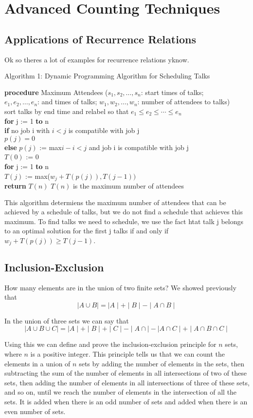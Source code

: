 \documentclass[../discrete.tex]{subfiles}
\begin{document}
\chapter{Advanced Counting Techniques}
\section{Applications of Recurrence Relations}
Ok so theres a lot of examples for recurrence relations yknow.

Algorithm 1: Dynamic Programming Algorithm for Scheduling Talks

\textbf{procedure} Maximum Attendees ($s_1,s_2,\dots,s_n$: start times of talks;\\ 
$e_1,e_2,\dots,e_n$: and times of talks; $w_1,w_2,\dots,w_n$: number of attendees to talks)\\
sort talks by end time and relabel so that $e_1\leq e_2\leq \cdots\leq e_n$\\
\textbf{for} j := 1 \textbf{to} n \\
\textbf{if} no job i with $i<j$ is compatible with job j \\
$p(j)=0$\\
\textbf{else} $p(j)$ := max{$i-i<j$ and job i is compatible with job j}\\
$T(0)$ := 0\\
\textbf{for} j := 1 \textbf{to} n \\
$T(j)$ := max($w_j+T(p(j)), T(j-1))$\\
\textbf{return} $T(n)$ {$T(n)$ is the maximum number of attendees}

This algorithm determiens the maximum number of attendees that can be achieved by a schedule of talks, but we do not 
find a schedule that achieves this maximum. To find talks we need to schedule, we use the fact htat talk j belongs to an optimal 
solution for the first j talks if and only if $w_j+T(p(j))\geq T(j-1)$. 
\section{Inclusion-Exclusion}
How many elements are in the union of two finite sets? We showed previously that 
\[\mid A \cup B \mid = \mid A \mid + \mid B \mid - \mid A \cap B \mid\]

In the union of three sets we can say that 
\[\mid A \cup B \cup C\mid = \mid A \mid + \mid B \mid + \mid C \mid - \mid A \cap \mid - \mid A \cap C\mid + \mid A \cap B \cap C \mid\]

Using this we can define and prove the inclusion-exclusion principle for $n$ sets, where $n$ is a positive integer. 
This principle tells us that we can count the elements in a union of $n$ sets by adding the number of elements in the sets, then 
subtracting the sum of the number of elements in all intersections of two of these sets, then adding the number of elements in all intersections of three of these sets, 
and so on, until we reach the number of elements in the intersection of all the sets. It is added when there is an odd number of sets and added when there is an even number of sets.
\end{document}

